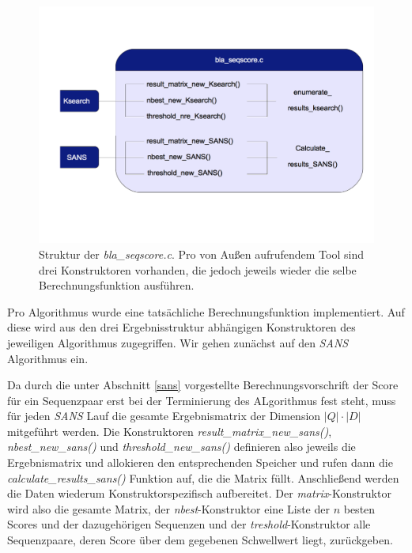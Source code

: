\documentclass{article}
\begin{document}
\begin{center}
  \begin{figure}
    \includegraphics[width = \linewidth]{img/dia2}
    \caption{Struktur der \emph{bla\_seqscore.c}. Pro von Außen aufrufendem Tool sind drei Konstruktoren vorhanden, die jedoch jeweils wieder die
    selbe Berechnungsfunktion ausführen.}
    \label{seqsc}
  \end{figure}
\end{center}

Pro Algorithmus wurde eine tatsächliche Berechnungsfunktion implementiert. Auf diese wird aus den drei Ergebnisstruktur abhängigen Konstruktoren des jeweiligen
Algorithmus zugegriffen. Wir gehen zunächst auf den \emph{SANS} Algorithmus ein.

Da durch die unter Abschnitt \ref{sans} vorgestellte Berechnungsvorschrift der Score für ein Sequenzpaar erst bei der Terminierung des ALgorithmus
fest steht, muss für jeden \emph{SANS} Lauf die gesamte Ergebnismatrix der Dimension $|Q|\cdot|D|$ mitgeführt werden. Die Konstruktoren 
\emph{result\_matrix\_new\_sans()}, \emph{nbest\_new\_sans()} und  \emph{threshold\_new\_sans()} definieren also jeweils die Ergebnismatrix und allokieren
den entsprechenden Speicher und rufen dann die \emph{calculate\_results\_sans()} Funktion auf, die die Matrix füllt. Anschließend werden die Daten 
wiederum Konstruktorspezifisch aufbereitet. Der \emph{matrix}-Konstruktor wird also die gesamte Matrix, der \emph{nbest}-Konstruktor eine
Liste der $n$ besten Scores und der dazugehörigen Sequenzen und der \emph{treshold}-Konstruktor alle Sequenzpaare, deren Score über dem gegebenen
Schwellwert liegt, zurückgeben.
\end{document}
